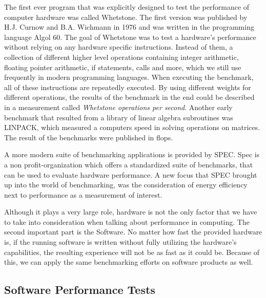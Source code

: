 The first ever program that was explicitly designed to test the performance of
computer hardware was called Whetstone. The first version was published by H.J.
Curnow and B.A. Wichmann in 1976 and was written in the programming language
Algol 60. The goal of Whetstone was to test a hardware's performance without
relying on any hardware specific instructions. Instead of them, a collection of
different higher level operations containing integer arithmetic, floating
pointer arithmetic, if statements, calls and more, which we still use frequently
in modern programming languages. When executing the benchmark, all of these
instructions are repeatedly executed. By using different weights for different
operations, the results of the benchmark in the end could be described in a
measurement called \emph{Whetstone operations per second}.  Another early
benchmark that resulted from a library of linear algebra subroutines was
LINPACK, which measured a computers speed in solving operations on matrices. The
result of the benchmarks were published in \gls{flops}.
\cite{OverviewBenchmarks}

A more modern suite of benchmarking applications is provided by SPEC. Spec is a
non profit-organization which offers a standardized suite of benchmarks, that
can be used to evaluate hardware performance. A new focus that SPEC brought up
into the world of benchmarking, was the consideration of energy efficiency next
to performance as a measurement of interest.
\cite{Spec}

Although it plays a very large role, hardware is not the only factor that we
have to take into consideration when talking about performance in computing. The
second important part is the Software. No matter how fast the provided hardware
is, if the running software is written without fully utilizing the hardware's
capabilities, the resulting experience will not be as fast as it could be.
Because of this, we can apply the same benchmarking efforts on software products
as well.



\subsection{Software Performance Tests}

